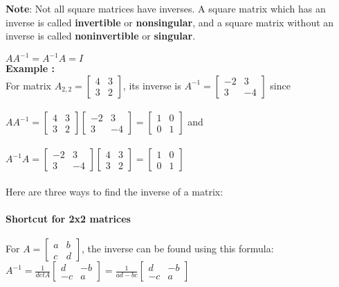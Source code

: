 \textbf{Note}: Not all square matrices have inverses. A square matrix which has an inverse is called \textbf{invertible} or \textbf{nonsingular}, and a square matrix without an inverse is called \textbf{noninvertible} or \textbf{singular}.

$AA^{-1} = A^{-1}A = I$ \\
\textbf{Example :} \\
For matrix 
$
A_{2,2} = 
\begin{bmatrix}
4 & 3 \\
3 & 2 
\end{bmatrix}
$, its inverse is 
$A^{-1} =
\begin{bmatrix}
-2 & 3 \\
3 & -4 
\end{bmatrix}
$ since \\ \\

$
AA^{-1} = 
\begin{bmatrix}
4 & 3 \\
3 & 2 
\end{bmatrix}
\begin{bmatrix}
-2 & 3 \\
3 & -4 
\end{bmatrix}
=
\begin{bmatrix}
1 & 0 \\
0 & 1 
\end{bmatrix}
$ and \\ \\
$
A^{-1}A = 
\begin{bmatrix}
-2 & 3 \\
3 & -4 
\end{bmatrix}
\begin{bmatrix}
4 & 3 \\
3 & 2 
\end{bmatrix}
=
\begin{bmatrix}
1 & 0 \\
0 & 1 
\end{bmatrix}
$ \\ \\

Here are three ways to find the inverse of a matrix:

\paragraph{Shortcut for 2x2 matrices}
For 
$
A = 
\begin{bmatrix}
a & b \\
c & d 
\end{bmatrix}
$, the inverse can be found using this formula: \\
$ A^{-1} = \frac{1}{det A}
\begin{bmatrix}
d & -b \\
-c & a 
\end{bmatrix}
=
\frac{1}{ad-bc}
\begin{bmatrix}
d & -b \\
-c & a 
\end{bmatrix}
$ \\ \\

